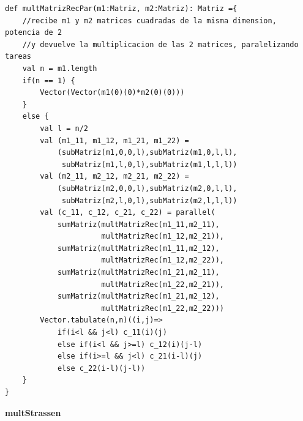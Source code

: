 \documentclass[12pt, a4paper]{article}
\begin{document}
\begin{lstlisting}[caption=mult matriz recursiva paralela, label=lst:scala_code9]
def multMatrizRecPar(m1:Matriz, m2:Matriz): Matriz ={
    //recibe m1 y m2 matrices cuadradas de la misma dimension, potencia de 2
    //y devuelve la multiplicacion de las 2 matrices, paralelizando tareas
    val n = m1.length
    if(n == 1) {
        Vector(Vector(m1(0)(0)*m2(0)(0)))
    }
    else {
        val l = n/2
        val (m1_11, m1_12, m1_21, m1_22) = 
            (subMatriz(m1,0,0,l),subMatriz(m1,0,l,l),
             subMatriz(m1,l,0,l),subMatriz(m1,l,l,l))
        val (m2_11, m2_12, m2_21, m2_22) =
            (subMatriz(m2,0,0,l),subMatriz(m2,0,l,l),
             subMatriz(m2,l,0,l),subMatriz(m2,l,l,l))
        val (c_11, c_12, c_21, c_22) = parallel(
            sumMatriz(multMatrizRec(m1_11,m2_11),
                      multMatrizRec(m1_12,m2_21)),
            sumMatriz(multMatrizRec(m1_11,m2_12),
                      multMatrizRec(m1_12,m2_22)),
            sumMatriz(multMatrizRec(m1_21,m2_11),
                      multMatrizRec(m1_22,m2_21)),
            sumMatriz(multMatrizRec(m1_21,m2_12),
                      multMatrizRec(m1_22,m2_22)))
        Vector.tabulate(n,n)((i,j)=>
            if(i<l && j<l) c_11(i)(j)
            else if(i<l && j>=l) c_12(i)(j-l)
            else if(i>=l && j<l) c_21(i-l)(j)
            else c_22(i-l)(j-l))
    }
}
\end{lstlisting}
\textbf{{multStrassen}} \\ \\
\end{document}

